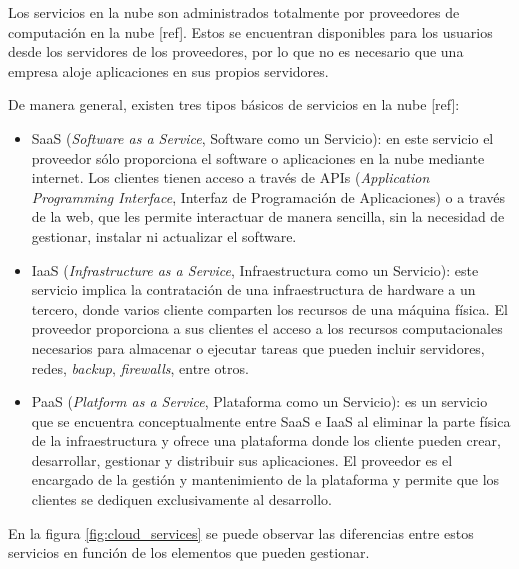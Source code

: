 Los servicios en la nube son administrados totalmente por proveedores de computación en la nube [ref]. Estos se encuentran disponibles para los usuarios desde los servidores de los proveedores, por lo que no es necesario que una empresa aloje aplicaciones en sus propios servidores.

De manera general, existen tres tipos básicos de servicios en la nube [ref]:

\begin{itemize}
	\item SaaS (\textit{Software as a Service}, Software como un Servicio): en este servicio el proveedor sólo proporciona el software o aplicaciones en la nube mediante internet. Los clientes tienen acceso a través de APIs (\textit{Application Programming Interface}, Interfaz de Programación de Aplicaciones) o a través de la web, que les permite interactuar de manera sencilla, sin la necesidad de gestionar, instalar ni actualizar el software.
	\item IaaS (\textit{Infrastructure as a Service}, Infraestructura como un Servicio): este servicio implica la contratación de una infraestructura de hardware a un tercero, donde varios cliente comparten los recursos de una máquina física. El proveedor proporciona a sus clientes el acceso a los recursos computacionales necesarios para almacenar o ejecutar tareas que pueden incluir servidores, redes, \textit{backup}, \textit{firewalls}, entre otros.
	\item PaaS (\textit{Platform as a Service}, Plataforma como un Servicio): es un servicio que se encuentra conceptualmente entre SaaS e IaaS al eliminar la parte física de la infraestructura y ofrece una plataforma donde los cliente pueden crear, desarrollar, gestionar y distribuir sus aplicaciones. El proveedor es el encargado de la gestión y mantenimiento de la plataforma y permite que los clientes se dediquen exclusivamente al desarrollo.
\end{itemize}

En la figura \ref{fig:cloud_services} se puede observar las diferencias entre estos servicios en función de los elementos que pueden gestionar.


